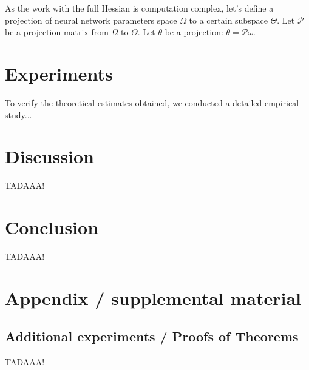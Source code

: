 \documentclass{article}
\begin{document}
As the work with the full Hessian is computation complex, let's define a projection of neural network parameters space
$\Omega$ to a certain subspace $\Theta$. Let $\mathcal{P}$ be a projection matrix from $\Omega$ to $\Theta$. Let $\theta$ be
a projection: $\theta = \mathcal{P}\omega$.

\section{Experiments}\label{sec:exp}

To verify the theoretical estimates obtained, we conducted a detailed empirical study...

\section{Discussion}\label{sec:disc}

TADAAA!

\section{Conclusion}\label{sec:concl}

TADAAA!







\newpage
\appendix
\section{Appendix / supplemental material}\label{app}

\subsection{Additional experiments / Proofs of Theorems}\label{app:exp}

TADAAA!
\end{document}
